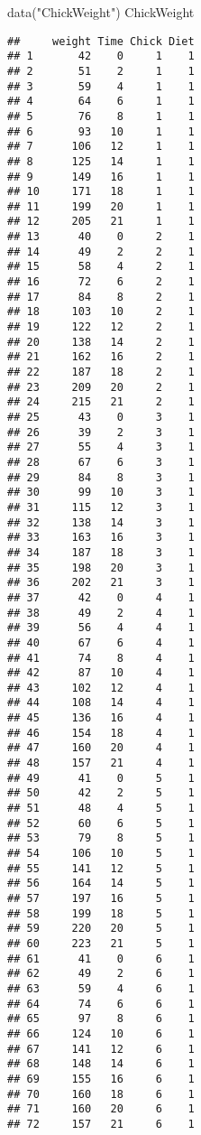 \documentclass[
]{article}
\newenvironment{Shaded}{\begin{snugshade}}{\end{snugshade}}
\newcommand{\FunctionTok}[1]{\textcolor[rgb]{0.00,0.00,0.00}{#1}}
\newcommand{\NormalTok}[1]{#1}
\newcommand{\StringTok}[1]{\textcolor[rgb]{0.31,0.60,0.02}{#1}}
\begin{document}
\begin{Shaded}
\begin{Highlighting}[]
\FunctionTok{data}\NormalTok{(}\StringTok{"ChickWeight"}\NormalTok{)}
\NormalTok{ChickWeight}
\end{Highlighting}
\end{Shaded}

\begin{verbatim}
##     weight Time Chick Diet
## 1       42    0     1    1
## 2       51    2     1    1
## 3       59    4     1    1
## 4       64    6     1    1
## 5       76    8     1    1
## 6       93   10     1    1
## 7      106   12     1    1
## 8      125   14     1    1
## 9      149   16     1    1
## 10     171   18     1    1
## 11     199   20     1    1
## 12     205   21     1    1
## 13      40    0     2    1
## 14      49    2     2    1
## 15      58    4     2    1
## 16      72    6     2    1
## 17      84    8     2    1
## 18     103   10     2    1
## 19     122   12     2    1
## 20     138   14     2    1
## 21     162   16     2    1
## 22     187   18     2    1
## 23     209   20     2    1
## 24     215   21     2    1
## 25      43    0     3    1
## 26      39    2     3    1
## 27      55    4     3    1
## 28      67    6     3    1
## 29      84    8     3    1
## 30      99   10     3    1
## 31     115   12     3    1
## 32     138   14     3    1
## 33     163   16     3    1
## 34     187   18     3    1
## 35     198   20     3    1
## 36     202   21     3    1
## 37      42    0     4    1
## 38      49    2     4    1
## 39      56    4     4    1
## 40      67    6     4    1
## 41      74    8     4    1
## 42      87   10     4    1
## 43     102   12     4    1
## 44     108   14     4    1
## 45     136   16     4    1
## 46     154   18     4    1
## 47     160   20     4    1
## 48     157   21     4    1
## 49      41    0     5    1
## 50      42    2     5    1
## 51      48    4     5    1
## 52      60    6     5    1
## 53      79    8     5    1
## 54     106   10     5    1
## 55     141   12     5    1
## 56     164   14     5    1
## 57     197   16     5    1
## 58     199   18     5    1
## 59     220   20     5    1
## 60     223   21     5    1
## 61      41    0     6    1
## 62      49    2     6    1
## 63      59    4     6    1
## 64      74    6     6    1
## 65      97    8     6    1
## 66     124   10     6    1
## 67     141   12     6    1
## 68     148   14     6    1
## 69     155   16     6    1
## 70     160   18     6    1
## 71     160   20     6    1
## 72     157   21     6    1

\end{verbatim}
\end{document}
